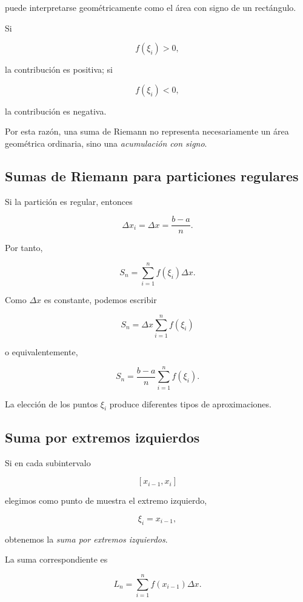 \documentclass[12pt]{article}
\begin{document}
puede interpretarse geométricamente como el área con signo de un
rectángulo.

Si

\[
f(\xi_i)>0,
\]

la contribución es positiva; si

\[
f(\xi_i)<0,
\]

la contribución es negativa.

Por esta razón, una suma de Riemann no representa necesariamente un área
geométrica ordinaria, sino una \emph{acumulación con signo}.

\subsection{Sumas de Riemann para particiones regulares}

Si la partición es regular, entonces

\[
\Delta x_i=\Delta x=\frac{b-a}{n}.
\]

Por tanto,

\[
S_n
=
\sum_{i=1}^{n}
f(\xi_i)\Delta x.
\]

Como $\Delta x$ es constante, podemos escribir

\[
\boxed{
S_n
=
\Delta x
\sum_{i=1}^{n}f(\xi_i)
}
\]

o equivalentemente,

\[
S_n
=
\frac{b-a}{n}
\sum_{i=1}^{n}f(\xi_i).
\]

La elección de los puntos $\xi_i$ produce diferentes tipos de
aproximaciones.

\subsection{Suma por extremos izquierdos}

Si en cada subintervalo

\[
[x_{i-1},x_i]
\]

elegimos como punto de muestra el extremo izquierdo,

\[
\xi_i=x_{i-1},
\]

obtenemos la \emph{suma por extremos izquierdos}.

La suma correspondiente es

\[
L_n
=
\sum_{i=1}^{n}
f(x_{i-1})\Delta x.
\]
\end{document}
